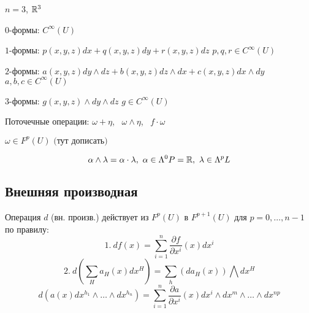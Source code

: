     \begin{illustration*}
        $n = 3$, $\mathbb{R}^3$
        \par $0$-формы: $C^\infty(U)$
        \par $1$-формы: $p(x, y, z)dx + q(x, y, z)dy + r(x, y, z)dz$ \quad $p, q, r \in C^\infty(U)$
        \par $2$-формы: $a(x, y, z)dy \wedge dz + b(x, y, z)dz \wedge dx + c(x, y, z)dx \wedge dy$ \quad $a, b, c \in C^\infty(U)$
        \par $3$-формы: $g(x, y, z) \wedge dy \wedge dz$ \quad $g \in C^\infty(U)$
    \end{illustration*}

    \par Поточечные операции: $\omega + \eta$, \ $\omega \wedge \eta$, \ $f \cdot \omega $
    \par $\omega \in F^p(U) \text{ (тут дописать)}$ %

    \[
        \alpha \wedge \lambda = \alpha \cdot \lambda, \ \alpha \in \Lambda^0P = \mathbb{R}, \ \lambda \in \Lambda^pL    
    \]

    \subsection*{Внешняя производная}
    
    \begin{illustration*}
        Операция $d$ (вн. произв.) действует из $F^p(U)$ в $F^{p+1}(U)$ для $p = 0, \dots, n-1$ по правилу:
        \[ %
            1.\ df(x) = \sum_{i=1}^n \frac{\partial f}{\partial x^i}(x) dx^i 
        \]
        \[
            2.\ d(\sum_H a_H(x) dx^H) = \sum_h(da_H(x)) \bigwedge dx^H
        \]
        \[
            d(a(x)dx^{h_1} \wedge \dots \wedge dx^{h_n}) = \sum_{i=1}^n \frac{\partial a}{\partial x^i}(x) dx^i \wedge dx^m \wedge \dots \wedge dx^{np}    
        \]
    \end{illustration*}

